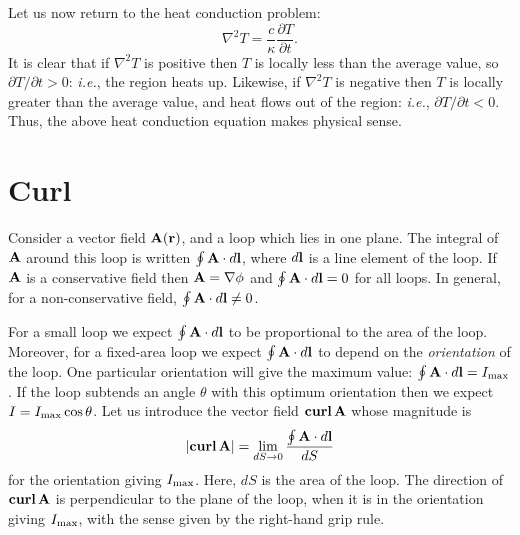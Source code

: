 Let us now return to the heat conduction problem:
\begin{equation}
\nabla^2 T = \frac{c}{\kappa} \frac{\partial T}{\partial t}.
\end{equation}
It is clear that if $\nabla^2 T$ is positive then $T$ is locally less than the
average value, so $\partial T/\partial t>0$: {\em i.e.}, the region heats up.
Likewise, if $\nabla^2 T$ is negative then $T$ is locally greater than the average
value, and heat flows out of the region: {\em i.e.}, $\partial T/\partial t<0$. Thus,
the above heat conduction equation makes physical sense.

\section{Curl}
Consider a vector field ${\bf A}({\bf r})$, and a loop  which lies in one plane. 
The integral of ${\bf A}$ around this loop is written
$\oint {\bf A}\cdot d{\bf l}$, where $d{\bf l}$ is a line element of the
loop. If ${\bf A}$ is a conservative field then 
${\bf A}= \nabla \phi$ and $\oint {\bf A}\cdot d{\bf l}=0$
for all loops. In general, for a non-conservative field, $\oint {\bf A}\cdot d{\bf l}\neq 0$.

For a small loop we expect $\oint {\bf A}\cdot d{\bf l}$ to be proportional to
the area of the loop. Moreover, for a fixed-area loop  we expect
$\oint {\bf A}\cdot d{\bf l}$ to depend on the {\em orientation}\/ of the loop.
One particular orientation will give the maximum value: $\oint {\bf A}\cdot d{\bf l}
= I_{\rm max}$. If the loop subtends an angle $\theta$ with this optimum orientation
then we expect $I= I_{\rm max}\cos\theta$. Let us introduce the vector field
${\bf curl}\,{\bf A}$ whose magnitude is
\begin{equation}
|{\bf curl}\,{\bf A}| = \lim_{dS\rightarrow 0}\frac{\oint {\bf A}\cdot
d{\bf l}}{dS}
\end{equation}
for the orientation giving $I_{\rm max}$. Here, $dS$ is the area of the loop.
The direction of ${\bf curl}\,{\bf A}$ is perpendicular to the plane of the loop,
 when it is
 in the 
orientation giving $I_{\rm max}$, with the sense given by the right-hand grip rule.

